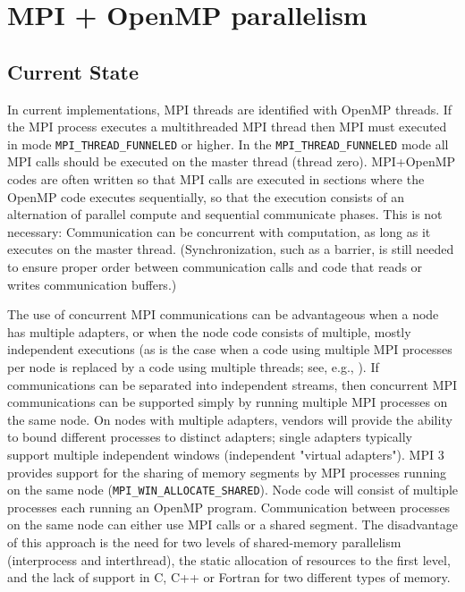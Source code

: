 	\section{MPI + OpenMP parallelism}
	\subsection{Current State}
	In current implementations, MPI threads are identified with OpenMP threads. 
	If the MPI process executes a multithreaded MPI thread then MPI must 
	executed in mode \texttt{MPI\_THREAD\_FUNNELED} or higher. In the  
	\texttt{MPI\_THREAD\_FUNNELED} mode all MPI calls should be 
	executed on the master thread (thread zero). MPI+OpenMP codes are often 
	written so that MPI calls are executed in sections where the OpenMP code 
	executes sequentially, so that the execution consists of an alternation of 
	parallel compute and sequential 
	communicate phases. This is not necessary: Communication can be concurrent 
	with computation, as long as it executes on the master 
	thread. (Synchronization, such as a barrier, is still needed to ensure 
	proper order between communication calls and code that reads or writes 
	communication buffers.)
	
	The use of concurrent MPI communications can be advantageous when a node 
	has multiple adapters, or when the node code consists of multiple, mostly 
	independent executions (as is the case when a code using multiple MPI 
	processes per node is replaced by a code using multiple threads; see, e.g., 
	\cite{akhmetova2017performance}). If communications can be separated into 
	independent 
	streams, then concurrent MPI communications can be supported simply by 
	running multiple MPI processes on the same node. On nodes with multiple 
	adapters, vendors will provide the ability to bound different processes to 
	distinct adapters; single adapters typically support multiple independent 
	windows (independent "virtual adapters"). MPI 3 provides support for the 
	sharing of memory segments by MPI processes running on the same node 
	(\texttt{MPI\_WIN\_ALLOCATE\_SHARED}).  Node code will consist of multiple 
	processes each running an OpenMP program. Communication between processes 
	on the same node can either use MPI calls or a shared segment. The 
	disadvantage of this approach is the need for two levels of shared-memory 
	parallelism (interprocess and interthread), the static allocation of 
	resources to the first level, and the lack of support in C, C++ or Fortran 
	for two different types of memory.
	

